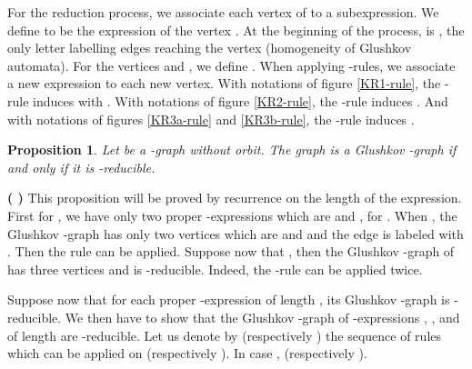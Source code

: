 \documentclass[11pt]{article}
\newtheorem{proposition}[theorem]{Proposition}
\begin{document}
 For the reduction process, we associate each vertex of  to a
subexpression. We define  to be the expression of the vertex .
At the beginning of the process,  is , the only letter
labelling edges reaching the vertex  (homogeneity of Glushkov
automata). For the vertices  and , we define
. When applying -rules, we associate a new
expression to each new vertex.  
With notations of figure \ref{KR1-rule}, the -rule induces
 with .
With notations of figure \ref{KR2-rule}, the -rule induces
.
And with notations of figures \ref{KR3a-rule} and \ref{KR3b-rule}, the
-rule induces .

\begin{proposition}\label{K-red}
Let  be a -graph without orbit. The graph  is a Glushkov -graph if and only if it is -reducible.
\end{proposition}
\noindent
{\bf (  )} This proposition will be proved by recurrence on the length of the expression. First for , we have only two proper -expressions which are  and , for . When , the Glushkov -graph has only two vertices which are  and  and the edge  is labeled with . Then the  rule can be applied. Suppose now that , then the Glushkov -graph of  has three vertices and is -reducible. Indeed, the -rule can be applied twice.

Suppose now that for each proper -expression  of length , its Glushkov -graph is -reducible. We then have to show that the Glushkov -graph of -expressions , ,  and  of length  are -reducible. Let us denote by  (respectively ) the sequence of rules which can be applied on  (respectively ). In case ,  (respectively ).
\end{document}
